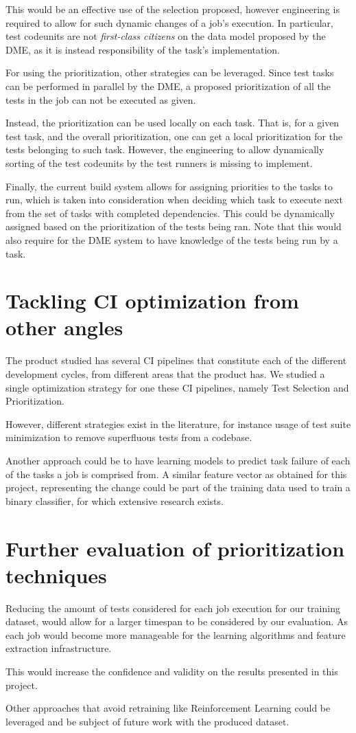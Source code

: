 This would be an effective use of the selection proposed, however engineering is required
to allow for such dynamic changes of a job's execution. In particular, test codeunits
are not \emph{first-class citizens} on the data model proposed by the DME, as
it is instead responsibility of the task's implementation.

For using the prioritization, other strategies can be leveraged. Since test tasks 
can be performed in parallel by the DME, a proposed prioritization of all the 
tests in the job can not be executed as given. 

Instead, the prioritization can be used locally on each task. That is, for a given
test task, and the overall prioritization, one can get a local prioritization for the
tests belonging to such task. However, the engineering to allow dynamically sorting of the test 
codeunits by the test runners is missing to implement.

Finally, the current build system allows for assigning priorities to the tasks to run,
which is taken into consideration when deciding which task to execute next from the 
set of tasks with completed dependencies. This could be dynamically assigned based on 
the prioritization of the tests being ran. Note that this would also require for the
DME system to have knowledge of the tests being run by a task.

\section{Tackling CI optimization from other angles}
The product studied has several CI pipelines that constitute each of the different
development cycles, from different areas that the product has. We studied a single
optimization strategy for one these CI pipelines, namely Test Selection and Prioritization.

However, different strategies exist in the literature, for instance usage of
test suite minimization to remove superfluous tests from a codebase.

Another approach could be to have learning models to predict task failure
of each of the tasks a job is comprised from. A similar feature vector as
obtained for this project, representing the change could be part of the training 
data used to train a binary classifier, for which extensive research exists.

\section{Further evaluation of prioritization techniques}
Reducing the amount of tests considered for each job execution for our training
dataset, would allow for a larger timespan to be considered by our evaluation.
As each job would become more manageable for the learning algorithms and feature
extraction infrastructure.

This would increase the confidence and validity on the results presented in this 
project.

Other approaches that avoid retraining like Reinforcement Learning could be 
leveraged and be subject of future work with the produced dataset.